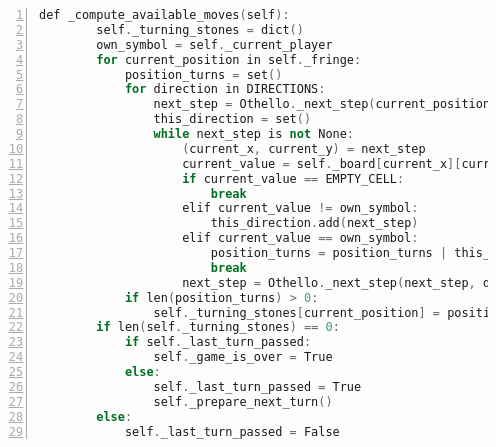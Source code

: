 \begin{lstlisting}[caption = {Die Funktion \code{\_compute\_available\_moves}}, language = cpp, captionpos = t , numbers=left, label={lst:fct-compute-available-moves}]
    def _compute_available_moves(self):
        self._turning_stones = dict()
        own_symbol = self._current_player
        for current_position in self._fringe:
            position_turns = set()
            for direction in DIRECTIONS:
                next_step = Othello._next_step(current_position, direction)
                this_direction = set()
                while next_step is not None:
                    (current_x, current_y) = next_step
                    current_value = self._board[current_x][current_y]
                    if current_value == EMPTY_CELL:
                        break
                    elif current_value != own_symbol:
                        this_direction.add(next_step)
                    elif current_value == own_symbol:
                        position_turns = position_turns | this_direction
                        break
                    next_step = Othello._next_step(next_step, direction)
            if len(position_turns) > 0:
                self._turning_stones[current_position] = position_turns
        if len(self._turning_stones) == 0:
            if self._last_turn_passed:
                self._game_is_over = True
            else:
                self._last_turn_passed = True
                self._prepare_next_turn()
        else:
            self._last_turn_passed = False
\end{lstlisting}

